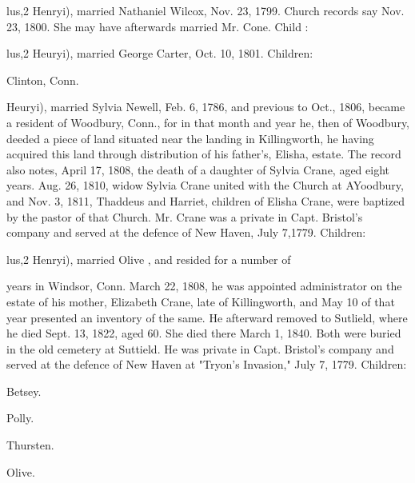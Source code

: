 \documentclass{book}
\begin{document}
lus,2 Henryi), married Nathaniel Wilcox, Nov. 23, 1799. Church 
records say Nov. 23, 1800. She may have afterwards married 
Mr. Cone. Child : 





lus,2 Heuryi), married George Carter, Oct. 10, 1801. Children: 






Clinton, Conn. 





Heuryi), married Sylvia Newell, Feb. 6, 1786, and previous to 
Oct., 1806, became a resident of Woodbury, Conn., for in that 
month and year he, then of Woodbury, deeded a piece of land 
situated near the landing in Killingworth, he having acquired 
this land through distribution of his father's, Elisha, estate. The 
record also notes, April 17, 1808, the death of a daughter of 
Sylvia Crane, aged eight years. Aug. 26, 1810, widow Sylvia 
Crane united with the Church at AYoodbury, and Nov. 3, 1811, 
Thaddeus and Harriet, children of Elisha Crane, were baptized 
by the pastor of that Church. Mr. Crane was a private in Capt. 
Bristol's company and served at the defence of New Haven, July 
7,1779. Children: 









lus,2 Henryi), married Olive , and resided for a number of 

years in Windsor, Conn. March 22, 1808, he was appointed 
administrator on the estate of his mother, Elizabeth Crane, late 
of Killingworth, and May 10 of that year presented an inventory 
of the same. He afterward removed to Sutlield, where he died 
Sept. 13, 1822, aged 60. She died there March 1, 1840. Both 
were buried in the old cemetery at Suttield. He was private in 
Capt. Bristol's company and served at the defence of New Haven 
at "Tryon's Invasion," July 7, 1779. Children: 





Betsey. 




Polly. 




Thursten. 




Olive. 
\end{document}
